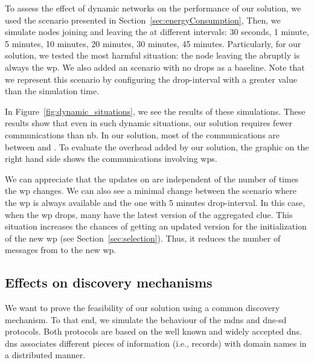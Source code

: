 

To assess the effect of dynamic networks on the performance of our solution, we used the scenario presented in Section~\ref{sec:energyConsumption},
Then, we simulate nodes joining and leaving the \Space{} at different intervals: 30 seconds, 1 minute, 5 minutes, 10 minutes, 20 minutes, 30 minutes, 45 minutes.
Particularly, for our solution, we tested the most harmful situation: the node leaving the \Space{} abruptly is always the \ac{wp}.
We also added an scenario with no drops as a baseline.
Note that we represent this scenario by configuring the drop-interval with a greater value than the simulation time.

In Figure~\ref{fig:dynamic_situations}, we see the results of these simulations.
These results show that even in such dynamic situations, our solution requires fewer communications than \acl{nb}.
In our solution, most of the communications are between \consumers{} and \providers{}.
To evaluate the overhead added by our solution, the graphic on the right hand side shows the communications involving \acp{wp}.

We can appreciate that the updates on \consumers{} are independent of the number of times the \ac{wp} changes.
We can also see a minimal change between the scenario where the \ac{wp} is always available and the one with 5 minutes drop-interval.
In this case, when the \ac{wp} drops, many \consumers{} have the latest version of the aggregated clue.
This situation increases the chances of getting an updated version for the initialization of the new \ac{wp} (see Section~\ref{sec:selection}).
Thus, it reduces the number of messages from \providers{} to the new \ac{wp}.


\subsection{Effects on discovery mechanisms}
\label{sec:mdns}

We want to prove the feasibility of our solution using a common discovery mechanism.
To that end, we simulate the behaviour of the \ac{mdns} and \ac{dns-sd}  protocols.
Both protocols are based on the well known and widely accepted \ac{dns}.
\ac{dns} associates different pieces of information (i.e., records) with domain names in a distributed manner.

